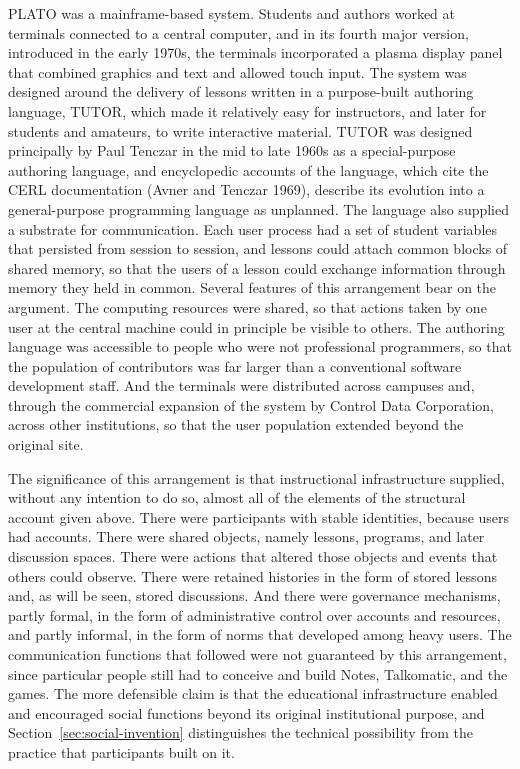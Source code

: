 \documentclass[11pt]{article}
\theoremstyle{remark}
\begin{document}
PLATO was a mainframe-based system. Students and authors worked at terminals connected to a central computer, and in its fourth major version, introduced in the early 1970s, the terminals incorporated a plasma display panel that combined graphics and text and allowed touch input. The system was designed around the delivery of lessons written in a purpose-built authoring language, TUTOR, which made it relatively easy for instructors, and later for students and amateurs, to write interactive material. TUTOR was designed principally by Paul Tenczar in the mid to late 1960s as a special-purpose authoring language, and encyclopedic accounts of the language, which cite the CERL documentation (Avner and Tenczar 1969), describe its evolution into a general-purpose programming language as unplanned. The language also supplied a substrate for communication. Each user process had a set of student variables that persisted from session to session, and lessons could attach common blocks of shared memory, so that the users of a lesson could exchange information through memory they held in common. Several features of this arrangement bear on the argument. The computing resources were shared, so that actions taken by one user at the central machine could in principle be visible to others. The authoring language was accessible to people who were not professional programmers, so that the population of contributors was far larger than a conventional software development staff. And the terminals were distributed across campuses and, through the commercial expansion of the system by Control Data Corporation, across other institutions, so that the user population extended beyond the original site.

The significance of this arrangement is that instructional infrastructure supplied, without any intention to do so, almost all of the elements of the structural account given above. There were participants with stable identities, because users had accounts. There were shared objects, namely lessons, programs, and later discussion spaces. There were actions that altered those objects and events that others could observe. There were retained histories in the form of stored lessons and, as will be seen, stored discussions. And there were governance mechanisms, partly formal, in the form of administrative control over accounts and resources, and partly informal, in the form of norms that developed among heavy users. The communication functions that followed were not guaranteed by this arrangement, since particular people still had to conceive and build Notes, Talkomatic, and the games. The more defensible claim is that the educational infrastructure enabled and encouraged social functions beyond its original institutional purpose, and Section~\ref{sec:social-invention} distinguishes the technical possibility from the practice that participants built on it.
\end{document}
